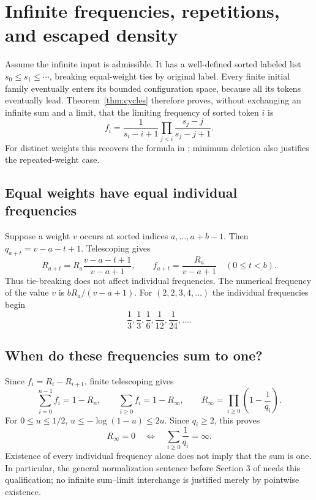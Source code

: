 \documentclass[11pt,letterpaper]{article}
\theoremstyle{definition}
\begin{document}
\section{Infinite frequencies, repetitions, and escaped density}\label{sec:densities}
Assume the infinite input is admissible. It has a well-defined sorted labeled
list $s_0\le s_1\le\cdots$, breaking equal-weight ties by original label.
Every finite initial family eventually enters its bounded configuration
space, because all its tokens eventually lead. Theorem~\ref{thm:cycles}
therefore proves, without exchanging an infinite sum and a limit, that the
limiting frequency of sorted token $i$ is
\begin{equation}\label{eq:infinitefreq}
 f_i=\frac1{s_i-i+1}
       \prod_{j<i}\frac{s_j-j}{s_j-j+1}.
\end{equation}
For distinct weights this recovers the formula in \cite[Theorem~4]{DD};
minimum deletion also justifies the repeated-weight case.

\subsection{Equal weights have equal individual frequencies}
Suppose a weight $v$ occurs at sorted indices $a,\ldots,a+b-1$. Then
$q_{a+t}=v-a-t+1$. Telescoping gives
\[
 R_{a+t}=R_a\frac{v-a-t+1}{v-a+1},\qquad
 f_{a+t}=\frac{R_a}{v-a+1}\quad(0\le t<b).
\]
Thus tie-breaking does not affect individual frequencies. The numerical
frequency of the value $v$ is $bR_a/(v-a+1)$.
For $(2,2,3,4,\ldots)$ the individual frequencies begin
\[
 \frac13,\frac13,\frac16,\frac1{12},\frac1{24},\ldots.
\]

\subsection{When do these frequencies sum to one?}
Since $f_i=R_i-R_{i+1}$, finite telescoping gives
\begin{equation}\label{eq:mass}
 \sum_{i=0}^{n-1}f_i=1-R_n,\qquad
 \sum_{i\ge0}f_i=1-R_\infty,\qquad
 R_\infty=\prod_{i\ge0}\left(1-\frac1{q_i}\right).
\end{equation}
For $0\le u\le1/2$,
$u\le-\log(1-u)\le2u$. Since $q_i\ge2$, this proves
\begin{equation}\label{eq:escapecriterion}
 R_\infty=0\quad\Longleftrightarrow\quad
       \sum_{i\ge0}\frac1{q_i}=\infty.
\end{equation}
Existence of every individual frequency alone does not imply that the sum
is one. In particular, the general normalization sentence before Section 3
of \cite[p.~3]{DD} needs this qualification; no infinite sum--limit interchange
is justified merely by pointwise existence.
\end{document}
